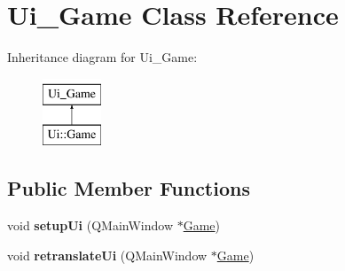 \hypertarget{class_ui___game}{\section{Ui\-\_\-\-Game Class Reference}
\label{class_ui___game}
}
Inheritance diagram for Ui\-\_\-\-Game\-:\begin{figure}[H]
\begin{center}
\leavevmode
\includegraphics[height=2.000000cm]{class_ui___game}
\end{center}
\end{figure}
\subsection*{Public Member Functions}
\begin{DoxyCompactItemize}
\item 
\hypertarget{class_ui___game_a25b518b870df2d4a35787422715bc285}{void {\bfseries setup\-Ui} (Q\-Main\-Window $\ast$\hyperlink{class_game}{Game})}\label{class_ui___game_a25b518b870df2d4a35787422715bc285}

\item 
\hypertarget{class_ui___game_ae2e6ce79da5b9c0b0a3fa9ea408f0aa4}{void {\bfseries retranslate\-Ui} (Q\-Main\-Window $\ast$\hyperlink{class_game}{Game})}\label{class_ui___game_ae2e6ce79da5b9c0b0a3fa9ea408f0aa4}

\end{DoxyCompactItemize}
